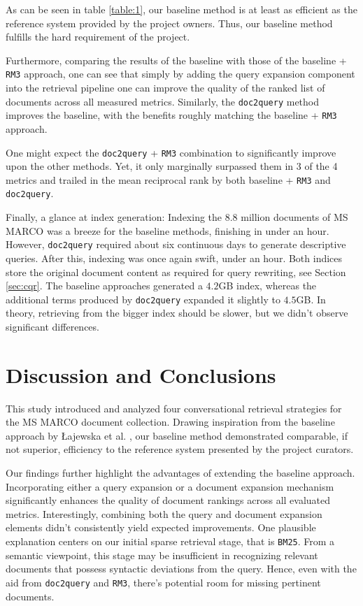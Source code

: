 \documentclass[sigconf]{acmart}
\begin{document}
As can be seen in table \ref{table:1}, our baseline method is at least as efficient as the reference system provided by the project owners. Thus, our baseline method fulfills the hard requirement of the project.

Furthermore, comparing the results of the baseline with those of the baseline + \texttt{RM3} approach, one can see that simply by adding the query expansion component into the retrieval pipeline one can improve the quality of the ranked list of documents across all measured metrics. Similarly, the \texttt{doc2query} method improves the baseline, with the benefits roughly matching the baseline + \texttt{RM3} approach.

One might expect the \texttt{doc2query} + \texttt{RM3} combination to significantly improve upon the other methods. Yet, it only marginally surpassed them in 3 of the 4 metrics and trailed in the mean reciprocal rank by both baseline + \texttt{RM3} and \texttt{doc2query}.

Finally, a glance at index generation: Indexing the 8.8 million documents of MS MARCO was a breeze for the baseline methods, finishing in under an hour. However, \texttt{doc2query} required about six continuous days to generate descriptive queries. After this, indexing was once again swift, under an hour. Both indices store the original document content as required for query rewriting, see Section \ref{sec:cqr}. The baseline approaches generated a $4.2$GB index, whereas the additional terms produced by \texttt{doc2query} expanded it slightly to $4.5$GB. In theory, retrieving from the bigger index should be slower, but we didn't observe significant differences.

\section{Discussion and Conclusions}
This study introduced and analyzed four conversational retrieval strategies for the MS MARCO document collection. Drawing inspiration from the baseline approach by Łajewska et al. \cite{Lajewska:2023:ECIR}, our baseline method demonstrated comparable, if not superior, efficiency to the reference system presented by the project curators.

Our findings further highlight the advantages of extending the baseline approach. Incorporating either a query expansion or a document expansion mechanism significantly enhances the quality of document rankings across all evaluated metrics. Interestingly, combining both the query and document expansion elements didn't consistently yield expected improvements. One plausible explanation centers on our initial sparse retrieval stage, that is \texttt{BM25}. From a semantic viewpoint, this stage may be insufficient in recognizing relevant documents that possess syntactic deviations from the query. Hence, even with the aid from \texttt{doc2query} and \texttt{RM3}, there's potential room for missing pertinent documents.
\end{document}
